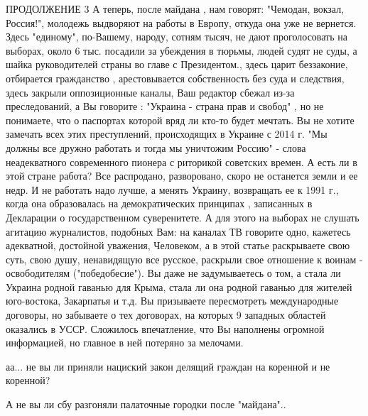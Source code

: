 \begin{itemize}
 

ПРОДОЛЖЕНИЕ 3 А теперь, после майдана , нам говорят: "Чемодан, вокзал,
Россия!", молодежь выдворяют на работы в Европу, откуда она уже не вернется.
Здесь "единому", по-Вашему, народу, сотням тысяч, не дают проголосовать на
выборах, около 6 тыс. посадили за убеждения в тюрьмы, людей судят не суды, а
шайка руководителей страны во главе с Президентом., здесь царит беззаконие,
отбирается гражданство , арестовывается собственность без суда и следствия,
здесь закрыли оппозиционные каналы, Ваш редактор сбежал из-за преследований, а
Вы говорите : "Украина - страна прав и свобод" , но не понимаете, что о
паспортах которой вряд ли кто-то будет мечтать. Вы не хотите замечать всех этих
преступлений, происходящих в Украине с 2014 г. "Мы должны все дружно работать и
тогда мы уничтожим Россию" - слова неадекватного современного пионера с
риторикой советских времен. А есть ли в этой стране работа? Все распродано,
разворовано, скоро не останется земли и ее недр. И не работать надо лучше, а
менять Украину, возвращать ее к 1991 г., когда она образовалась на
демократических принципах , записанных в Декларации о государственном
суверенитете. А для этого на выборах не слушать агитацию журналистов, подобных
Вам: на каналах ТВ говорите одно, кажетесь адекватной, достойной уважения,
Человеком, а в этой статье раскрываете свою суть, свою душу, ненавидящую все
русское, раскрыли свое отношение к воинам - освободителям ("победобесие"). Вы
даже не задумываетесь о том, а стала ли Украина родной гаванью для Крыма, стала
ли она родной гаванью для жителей юго-востока, Закарпатья и т.д. Вы призываете
пересмотреть международные договоры, но забываете о тех договорах, на которых 9
западных областей оказались в УССР. Сложилось впечатление, что Вы наполнены
огромной информацией, но главное в ней потеряно за мелочами.

 

аа... не вы ли приняли нациский закон делящий граждан на коренной и не
коренной?

А не вы ли сбу разгоняли палаточные городки после "майдана"..


\end{itemize}
